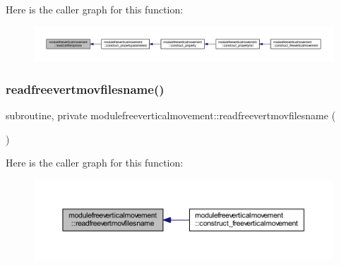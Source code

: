 Here is the caller graph for this function\+:\nopagebreak
\begin{figure}[H]
\begin{center}
\leavevmode
\includegraphics[width=350pt]{namespacemodulefreeverticalmovement_a2b10bad3ef2fbac72aed08e6bf29bcd6_icgraph}
\end{center}
\end{figure}
\mbox{\label{namespacemodulefreeverticalmovement_adb8368e5dfca81f3d1a6bd7881e19c7f}} 
\subsubsection{\texorpdfstring{readfreevertmovfilesname()}{readfreevertmovfilesname()}}
{\footnotesize\ttfamily subroutine, private modulefreeverticalmovement\+::readfreevertmovfilesname (\begin{DoxyParamCaption}{ }\end{DoxyParamCaption})\hspace{0.3cm}{\ttfamily [private]}}

Here is the caller graph for this function\+:\nopagebreak
\begin{figure}[H]
\begin{center}
\leavevmode
\includegraphics[width=350pt]{namespacemodulefreeverticalmovement_adb8368e5dfca81f3d1a6bd7881e19c7f_icgraph}
\end{center}
\end{figure}
\mbox{\label{namespacemodulefreeverticalmovement_a6822a6ac8c2596feb6110b6fa936b42b}} 
